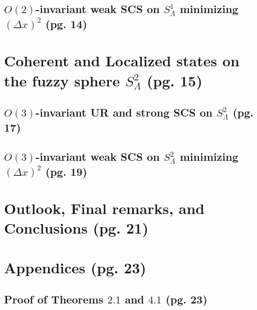 \documentclass{article}
\begin{document}
\subsection{$O(2)$-invariant weak SCS on $S^1_\Lambda$ minimizing $(\Delta x)^2$ (pg. 14)}


\section{Coherent and Localized states on the fuzzy sphere $S^2_\Lambda$ (pg. 15)}

\subsection{$O(3)$-invariant UR and strong SCS on $S^2_\Lambda$ (pg. 17)}

\subsection{$O(3)$-invariant weak SCS on $S^2_\Lambda$ minimizing $(\Delta x)^2$ (pg. 19)}

\section{Outlook, Final remarks, and Conclusions (pg. 21)}

\section{Appendices (pg. 23)}

\subsection{Proof of Theorems $2.1$ and $4.1$ (pg. 23)}
\end{document}
